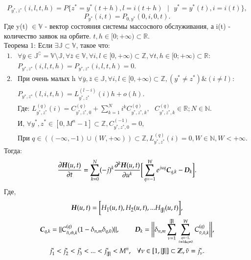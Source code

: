 \[P_{y^*, z^*}( i, l, t, h) = P\{z^* = y^*(t + h), l = i(t + h)\text{ }|\text{ } y^* = y^*(t), i = i(t) \},\]
\[P_{y^*}(i, t) = P_{0, y^*}( 0, i, 0, t).\]
Где y(t) \(\in \mathbb{V}\) - вектор состояния системы массосвого обслуживания, а i(t) - количество заявок на орбите. 
\( t,h \in [0; + \infty) \subset \mathbb{R}\).\\
Теорема 1:
Если \(\exists \mathbb{J} \subset \mathbb{V}\), такое что:
\begin{equation}\label{condition_of_main_theorem}\begin{aligned}
		1.& \forall \bar{y} \in \mathbb{J}^\complement = \mathbb{V} \setminus{} \mathbb{J},
		\forall \bar{z} \in \mathbb{V}, \forall i,l\in [0,+\infty)\subset \mathbb{Z}, 
		\forall t,h \in [0;+\infty) \subset \mathbb{R}: \\
		&P_{ y^*, z^*}( i, l, t, h)  = P_{y^*, z^*}( i, l, t, h) =  0.\\
		2.& \text{При очень малых h } 
            \forall \bar{y},\bar{z} \in \mathbb{J}, 
            \forall i,l\in [0,+\infty)\subset \mathbb{Z}, 
            (y^* \neq z^*) \& (i \neq l):\\
		    &P_{ y^*, z^*}(l, i, t, h) =  L^{(l-i)}_{ y^*, z^*}(i)h + o(h).\\
		    &\text{Где: }L^{(q)}_{ y^*, z^*}(i)=C^{(q)}_{ y^*, z^*, 0}+\sum^{N}_{k=1}i^kC^{(q)}_{ y^*, z^*, k}, 
		    \text{ }C^{(q)}_{ y^*, z^*, k}\in \mathbb{R}; N \in \mathbb{N}.\\
		    &\text{И, } \forall y^*,z^* \in [0,M^n -1] \subset \mathbb{Z},C^{(-1)}_{ y^*, z^*,0} = 0,\\
		    &\text{При }q\in ((-\infty,-1) \cup (W, +\infty)) \subset \mathbb{Z}, 
		    L^{(q)}_{ y^*, z^*}(i)=0, W \in \mathbb{N}, W < +\infty.
\end{aligned} \end{equation}
Тогда:
\[\pdv{\boldsymbol{H}(u,t)}{t} =\sum_{k = 0}^{N}(-j)^k \pdv[k]{\boldsymbol{H}(u,t)}{u} \bigg[
\sum_{q = -1}^{W} e^{juq}\boldsymbol{C}_{q,k}-\boldsymbol{D}_k\bigg].\]
Где,
\begin{gather*}
	\boldsymbol{H}(u,t) = \bigg[H_{\tilde{1}}(u,t), H_{\tilde{2}}(u,t), ... H_{\tilde{|\mathbb{J}|} }(u,t)\bigg] ,\\
	\boldsymbol{C}_{q,k} = ||C^{(q)}_{\tilde{n},\tilde{m}, k}(1-\delta_{n,m}\delta_{q,0})||,
	\text{ }\text{ }\text{ }\text{ }\text{ }\text{ }\text{ }\text{ }\text{ }\boldsymbol{D}_k = \bigg|\bigg|\delta_{n,m}
	\sum_{\nu = 1}^{|\mathbb{J}|}\sum_{q = -1 ,\atop \tilde{\nu}\neq \tilde{n}\& q\neq 0 }^{W}C^{(q)}_{\tilde{\nu},\tilde{n},k} \bigg|\bigg|, \\
	j^*_1 < j^*_2 < j^*_3 <... < j^*_{|\mathbb{J}|} < M^n, \text{ }\text{ }\text{ }
	\forall \nu \in [1, |\mathbb{J}|] \subset \mathbb{Z}, \tilde{\nu} = j^*_{\nu}.
\end{gather*}